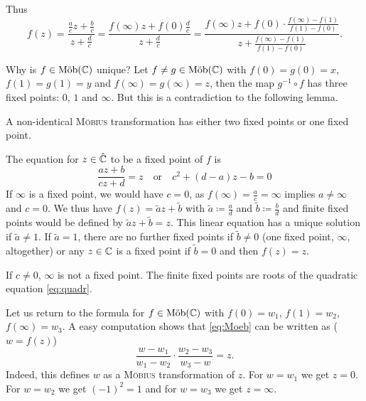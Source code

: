 \documentclass[a4paper,english]{article}
\begin{document}
\begin{pr}
\begin{enumerate}
        Thus
        \begin{equation} \label{eq:Moeb}
            f(z)
            = \frac{\frac{a}{c} z + \frac{b}{c}}{z + \frac{d}{c}}
            = \frac{f(\infty) z + f(0) \frac{d}{c}}{z + \frac{d}{c}}
            = \frac{f(\infty) z + f(0) \cdot \frac{f(\infty) - f(1)}{f(1) - f(0)}}{z + \frac{f(\infty) - f(1)}{f(1) - f(0)}}.
        \end{equation}
    \end{enumerate}
\end{pr}

Why is $f \in \Moeb(\CC)$ unique?
Let $f \ne g \in \Moeb(\CC)$ with $f(0) = g(0) = x$, $f(1) = g(1) = y$ and $f(\infty) = g(\infty) = z$, then the map $g^{-1} \circ f$ has three fixed points: $0$, $1$ and $\infty$. 
But this is a contradiction to the following lemma.

\begin{lemma}
    A non-identical \textsc{Möbius} transformation has either two fixed points or one fixed point.
\end{lemma}

\begin{pr}
    The equation for $z \in \hat{\CC}$ to be a fixed point of $f$ is
    \begin{equation} \label{eq:quadr}
        \frac{a z + b}{c z + d} 
        = z
        \quad \text{or} \quad
        c^2 + (d - a)z - b = 0
    \end{equation}
    If $\infty$ is a fixed point, we would have $c = 0$, as $f(\infty) = \frac{a}{c} = \infty$ implies $a \ne \infty$ and $c = 0$.
    We thus have $f(z) = \tilde{a} z + \tilde{b}$ with $\tilde{a} \coloneqq \frac{a}{d}$ and $\tilde{b} \coloneqq \frac{b}{d}$ and finite fixed points would be defined by $\tilde{a} z + \tilde{b} = z$.
    This linear equation has a unique solution if $\tilde{a} \ne 1$.
    If $\tilde{a} = 1$, there are no further fixed points if $\tilde{b} \ne 0$ (one fixed point, $\infty$, altogether) or any $z \in \CC$ is a fixed point if $\tilde{b} = 0$ and then $f(z) = z$.
    
    If $c \ne 0$, $\infty$ is not a fixed point.
    The finite fixed points are roots of the quadratic equation \eqref{eq:quadr}.
\end{pr}

Let us return to the formula for $f \in \Moeb(\CC)$ with $f(0) = w_1$, $f(1) = w_2$, $f(\infty) = w_3$.
A easy computation shows that \eqref{eq:Moeb} can be written as ($w = f(z)$)
\begin{equation*}
    \frac{w - w_1}{w_1 - w_2} \cdot \frac{w_2 - w_3}{w_3 - w}
    = z.
\end{equation*}
Indeed, this defines $w$ as a \textsc{Möbius} transformation of $z$.
For $w = w_1$ we get $z = 0$.
For $w = w_2$ we get $(-1)^2 = 1$ and for $w = w_3$ we get $z = \infty$.
\end{document}
